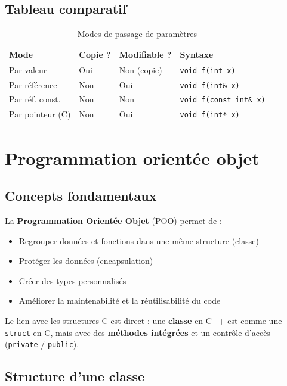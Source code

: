 \documentclass[12pt,a4paper]{article}
\begin{document}
\subsection{Tableau comparatif}

\begin{table}[h!]
\centering
\caption{Modes de passage de paramètres}
\begin{tabular}{llll}
\toprule
\textbf{Mode} & \textbf{Copie ?} & \textbf{Modifiable ?} & \textbf{Syntaxe} \\
\midrule
Par valeur & Oui & Non (copie) & \texttt{void f(int x)} \\
Par référence & Non & Oui & \texttt{void f(int\& x)} \\
Par réf. const. & Non & Non & \texttt{void f(const int\& x)} \\
Par pointeur (C) & Non & Oui & \texttt{void f(int* x)} \\
\bottomrule
\end{tabular}
\end{table}

\section{Programmation orientée objet}

\subsection{Concepts fondamentaux}

La \textbf{Programmation Orientée Objet} (POO) permet de :
\begin{itemize}
    \item Regrouper données et fonctions dans une même structure (classe)
    \item Protéger les données (encapsulation)
    \item Créer des types personnalisés
    \item Améliorer la maintenabilité et la réutilisabilité du code
\end{itemize}

\begin{astuce}
Le lien avec les structures C est direct : une \textbf{classe} en C++ est comme une \texttt{struct} en C, mais avec des \textbf{méthodes intégrées} et un contrôle d'accès (\texttt{private} / \texttt{public}).
\end{astuce}

\subsection{Structure d'une classe}
\end{document}
